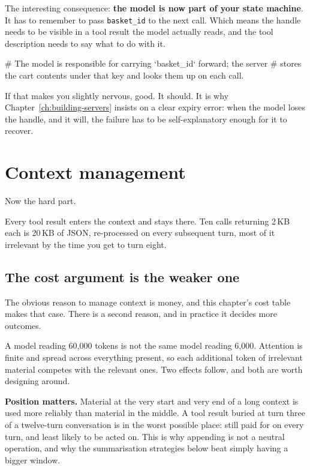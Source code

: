 The interesting consequence: \textbf{the model is now part of your state
machine}. It has to remember to pass \texttt{basket\_id} to the next call. Which
means the handle needs to be visible in a tool result the model actually reads,
and the tool description needs to say what to do with it.

\begin{py}
# The model is responsible for carrying `basket_id` forward; the server
# stores the cart contents under that key and looks them up on each call.
\end{py}

If that makes you slightly nervous, good. It should. It is why
Chapter~\ref{ch:building-servers} insists on a clear expiry error: when the model
loses the handle, and it will, the failure has to be self-explanatory enough for
it to recover.

\section{Context management}

Now the hard part.

Every tool result enters the context and stays there. Ten calls returning 2\,KB
each is 20\,KB of JSON, re-processed on every subsequent turn, most of it
irrelevant by the time you get to turn eight.


\subsection{The cost argument is the weaker one}

The obvious reason to manage context is money, and this chapter's cost table
makes that case. There is a second reason, and in practice it decides more
outcomes.

A model reading 60,000 tokens is not the same model reading 6,000. Attention is
finite and spread across everything present, so each additional token of
irrelevant material competes with the relevant ones. Two effects follow, and
both are worth designing around.

\textbf{Position matters.} Material at the very start and very end of a long
context is used more reliably than material in the middle. A tool result buried
at turn three of a twelve-turn conversation is in the worst possible place: still
paid for on every turn, and least likely to be acted on. This is why appending
is not a neutral operation, and why the summarisation strategies below beat
simply having a bigger window.

